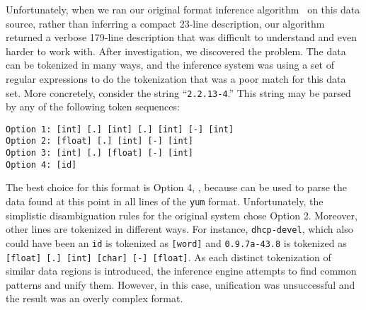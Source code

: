 Unfortunately, when we ran our original format
inference algorithm~\cite{fisher+:dirttoshovels}
on this data source, rather than inferring a compact 23-line
description, our algorithm returned a verbose 179-line description
that was difficult to understand and even harder to work with.
After investigation, we discovered the problem.  The data can be
tokenized in many ways, and the inference system was using a set of
regular expressions to do the tokenization that was a poor match for
this data set. 
 More concretely, consider 
the string ``{\tt 2.2.13-4}.'' This string may be parsed by 
any of the following token sequences: {\small
\begin{verbatim}
Option 1: [int] [.] [int] [.] [int] [-] [int]
Option 2: [float] [.] [int] [-] [int]
Option 3: [int] [.] [float] [-] [int]
Option 4: [id]
\end{verbatim}
}\normalsize
The best choice for this format is Option 4, ,
because  can be used to parse the data found at this point in
all lines of the {\tt yum} format.  Unfortunately, the simplistic 
disambiguation rules for the original system chose Option 2.  Moreover,
other lines are tokenized in different ways.
For instance, {\tt dhcp-devel}, which also could have been an {\tt id}
is tokenized as {\tt [word]} and 
{\tt 0.9.7a-43.8} is tokenized as
{\tt [float] [.] [int] [char] [-] [float]}.  As each distinct
tokenization of similar data regions is introduced, the inference
engine attempts to find common patterns and unify them.  However,
in this case, unification was unsuccessful and the
result was an overly complex format.
  


